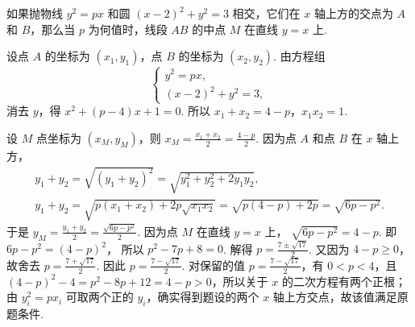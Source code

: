 \documentclass[UTF8,a4paper,oneside,11pt]{ctexbook}
\begin{document}
\begin{problem}

如果抛物线 \(y^{2}=px\) 和圆 \((x-2)^{2}+y^{2}=3\) 相交，它们在 \(x\) 轴上方的交点为 \(A\) 和 \(B\)，那么当 \(p\) 为何值时，线段 \(AB\) 的中点 \(M\) 在直线 \(y=x\) 上.

\end{problem}

\begin{solution}
%
设点 \(A\) 的坐标为 \((x_{1},y_{1})\)，点 \(B\) 的坐标为 \((x_{2},y_{2})\). 由方程组
\[
\begin{cases}
y^{2}=px,\\
(x-2)^{2}+y^{2}=3,
\end{cases}
\]
消去 \(y\)，得 \(x^{2}+(p-4)x+1=0\).
所以 \(x_{1}+x_{2}=4-p\)，\(x_{1}x_{2}=1\).

设 \(M\) 点坐标为 \((x_{M},y_{M})\)，则 \(x_{M}=\frac{x_{1}+x_{2}}{2}=\frac{4-p}{2}\).
因为点 \(A\) 和点 \(B\) 在 \(x\) 轴上方，
\[
\begin{gathered}
y_{1}+y_{2}=\sqrt{\left( y_{1}+y_{2} \right)^{2}}=\sqrt{y_{1}^{2}+y_{2}^{2}+2y_{1}y_{2}},\\
y_{1}+y_{2}=\sqrt{p\left( x_{1}+x_{2} \right)+2p\sqrt{x_{1}x_{2}}}=\sqrt{p(4-p)+2p}=\sqrt{6p-p^{2}}.
\end{gathered}
\]
于是 \(y_{M}=\frac{y_{1}+y_{2}}{2}=\frac{\sqrt{6p-p^{2}}}{2}\).
因为点 \(M\) 在直线 \(y=x\) 上，
\(\sqrt{6p-p^{2}}=4-p\).
即 \(6p-p^{2}=\left( 4-p \right)^{2}\)，
所以 \(p^{2}-7p+8=0\).
解得 \(p=\frac{7\pm \sqrt{17}}{2}\).
又因为 \(4-p\geqslant 0\)，故舍去 \(p=\frac{7+\sqrt{17}}{2}\). 因此 \(p=\frac{7-\sqrt{17}}{2}\).
对保留的值 \(p=\frac{7-\sqrt{17}}{2}\)，有 \(0<p<4\)，且 \((4-p)^2-4=p^2-8p+12=4-p>0\)，所以关于 \(x\) 的二次方程有两个正根；由 \(y_i^2=px_i\) 可取两个正的 \(y_i\)，确实得到题设的两个 \(x\) 轴上方交点，故该值满足原题条件.
\end{solution}

\end{document}
